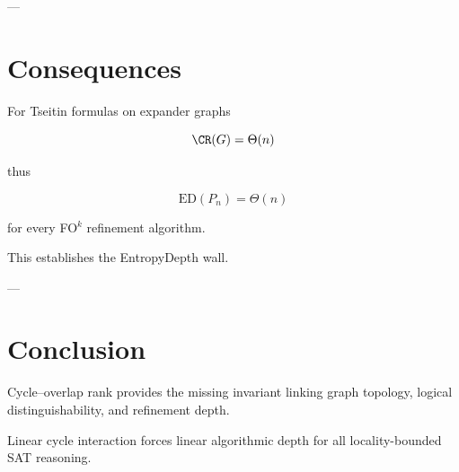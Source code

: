 \documentclass[11pt]{article}
\begin{document}
---

\section{Consequences}

For Tseitin formulas on expander graphs

\[
\CR(G) = \Theta(n)
\]

thus

\[
\mathrm{ED}(P_n) = \Theta(n)
\]

for every FO$^k$ refinement algorithm.

This establishes the EntropyDepth wall.

---

\section{Conclusion}

Cycle–overlap rank provides the missing invariant linking
graph topology, logical distinguishability, and refinement depth.

Linear cycle interaction forces linear algorithmic depth
for all locality-bounded SAT reasoning.
\end{document}
